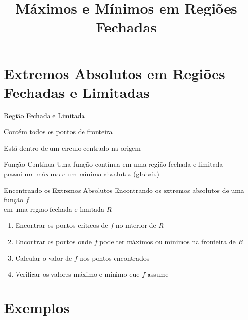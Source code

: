\documentclass[fleqn,utf8,aspectratio=169,12pt,ignorenonframetext]{beamer}
\title{Máximos e Mínimos em Regiões Fechadas}
\begin{document}
\addtitle

\section{Extremos Absolutos em Regiões Fechadas e Limitadas}

\begin{frame}{Região Fechada e Limitada}
  \begin{description}[<+->]
    \item[Fechada] Contém todos os pontos de fronteira \\[5mm]
    \item[Limitada] Está dentro de um círculo centrado na origem
  \end{description}
\end{frame}

\begin{frame}{Função Contínua}
  Uma função contínua em uma região fechada e limitada\\
  possui um máximo e um mínimo absolutos (globais)
\end{frame}

\begin{frame}{Encontrando os Extremos Absolutos}
  Encontrando os extremos absolutos de uma função $f$ \\
  em uma região fechada e limitada $R$
  \pause
  \begin{enumerate}[<+->]
    \item Encontrar os pontos críticos de $f$ no interior de $R$
    \item Encontrar os pontos onde $f$ pode ter máximos ou mínimos na fronteira de $R$
    \item Calcular o valor de $f$ nos pontos encontrados
    \item Verificar os valores máximo e mínimo que $f$ assume
  \end{enumerate}
\end{frame}

\section{Exemplos}
\end{document}
